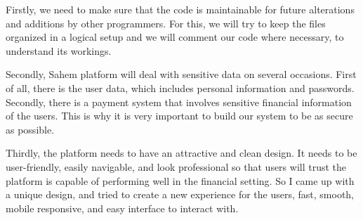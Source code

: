 Firstly, we need to make sure
that the code is maintainable for future alterations and additions by other programmers. For this, we will try
to keep the files organized in a logical setup and we will comment our code where necessary, to understand
its workings.

Secondly, Sahem platform will deal with sensitive data on several occasions. First of all, there
is the user data, which includes personal information and passwords. Secondly, there is a payment system
that involves sensitive financial information of the users. This is why it is very important to build our system
to be as secure as possible.

Thirdly, the platform needs to have an attractive and clean design. It needs to be user-friendly, easily navigable, and look professional so that users will trust the platform is capable of performing
well in the financial setting. So I came up with a unique design, and tried to create a new experience for the users, fast,
smooth, mobile responsive, and easy interface to interact with.
